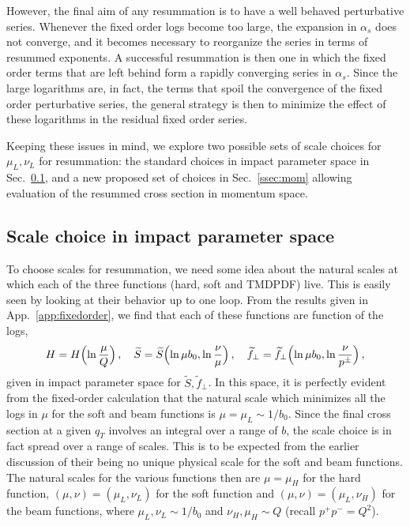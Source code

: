 \documentclass[a4,letterpaper,11pt]{article}
\newcommand{\be}{\begin{equation}}
\newcommand{\ee}{\end{equation}}
\newcommand{\wt}{\widetilde}
\newcommand{\ssec}[1]{Sec.~\ref{ssec:#1}}
\newcommand{\appx}[1]{App.~\ref{app:#1}}
\begin{document}
However, the final aim of any resummation is to have a well behaved perturbative series. Whenever the fixed order logs become too large, the expansion in $\alpha_s$ does not converge, and it becomes necessary to reorganize the series in terms of resummed exponents. A successful resummation is then one in which the fixed order terms that are left behind form a rapidly converging series in $\alpha_s$. Since the large logarithms are, in fact, the terms that spoil the convergence of the fixed order perturbative series, the general strategy is then to minimize the effect of these logarithms in the residual fixed order series.

Keeping these issues in mind, we explore two possible sets of scale choices for $\mu_L,\nu_L$ for resummation: the standard choices in impact parameter space in \ssec{CSS}, and a new proposed set of choices in \ssec{mom} allowing evaluation of the resummed cross section in momentum space.

\subsection{Scale choice in impact parameter space}
\label{ssec:CSS}

To choose scales for resummation, we need some idea about the natural scales at which each of the three functions (hard, soft and TMDPDF) live. This is easily seen by looking at their behavior up to one loop. From the results given in \appx{fixedorder}, we find that each of these functions are function of the logs,
\be
H = H\Bigl(\ln\frac\mu Q\Bigr)\,,\quad \wt S = \wt S\Bigl( \ln \mu b_0,\ln \frac{\nu}{\mu}\Bigr)\,,\quad \wt f_\perp = \wt f_\perp\Bigl( \ln \mu b_0,\ln \frac{\nu}{p^\pm}\Bigr)\,,
\ee
given in impact parameter space for $\wt S,\wt f_\perp$. In this space, it is perfectly evident from the fixed-order calculation that the natural scale which minimizes all the logs in $\mu$ for the soft and beam functions is $\mu =\mu_L \sim 1/b_0$. Since the final cross section at a given $q_T$ involves an integral over a range of $b$, the scale choice is in fact spread over a range of  scales. This is to be expected from the earlier discussion of their being no unique physical scale for the soft and beam functions. The natural scales for the various functions then are $\mu=\mu_H$ for the hard function, $(\mu,\nu) = (\mu_L,\nu_L)$ for the soft function and $(\mu,\nu) = (\mu_L,\nu_H)$ for the beam functions, where $\mu_L, \nu_L \sim 1/b_0$ and $\nu_H , \mu_H \sim Q$ (recall $p^+p^- = Q^2$).
\end{document}
